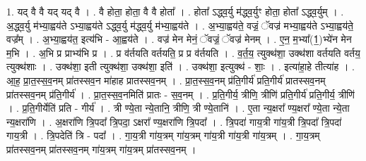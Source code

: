 \documentclass[17pt]{extarticle}
\begin{document}
1. यद् वै वै यद् यद् वै । . वै होता॒ होता॒ वै वै होता᳚ । . होता᳚ ऽद्ध्व॒र्यु म॑द्ध्व॒र्युꣳ होता॒ होता᳚ ऽद्ध्व॒र्युम् । . अ॒द्ध्व॒र्यु म॑भ्या॒ह्वय॑ते ऽभ्या॒ह्वय॑ते ऽद्ध्व॒र्यु म॑द्ध्व॒र्यु म॑भ्या॒ह्वय॑ते । . अ॒भ्या॒ह्वय॑ते॒ वज्रं॒ ॅवज्र॑ मभ्या॒ह्वय॑ते ऽभ्या॒ह्वय॑ते॒ वज्र᳚म् । . अ॒भ्या॒ह्वय॑त॒ इत्य॑भि - आ॒ह्वय॑ते । . वज्र॑ मेन मेनं॒ ॅवज्रं॒ ॅवज्र॑ मेनम् । . ए॒न॒ म॒भ्या᳚(1॒)भ्ये॑न मेन म॒भि । . अ॒भि प्र प्राभ्य॑भि प्र । . प्र व॑र्तयति वर्तयति॒ प्र प्र व॑र्तयति । . व॒र्त॒य॒ त्युक्थ॑शा॒ उक्थ॑शा वर्तयति वर्तय॒ त्युक्थ॑शाः । . उक्थ॑शा॒ इती त्युक्थ॑शा॒ उक्थ॑शा॒ इति॑ । . उक्थ॑शा॒ इत्युक्थ॑ - शाः॒ । . इत्या॑हा॒हे तीत्या॑ह । . आ॒ह॒ प्रा॒त॒स्स॒व॒नम् प्रा॑तस्सव॒न मा॑हाह प्रातस्सव॒नम् । . प्रा॒त॒स्स॒व॒नम् प्र॑ति॒गीर्य॑ प्रति॒गीर्य॑ प्रातस्सव॒नम् प्रा॑तस्सव॒नम् प्र॑ति॒गीर्य॑ । . प्रा॒त॒स्स॒व॒नमिति॑ प्रातः - स॒व॒नम् । . प्र॒ति॒गीर्य॒ त्रीणि॒ त्रीणि॑ प्रति॒गीर्य॑ प्रति॒गीर्य॒ त्रीणि॑ । . प्र॒ति॒गीर्येति॑ प्रति - गीर्य॑ । . त्री ण्ये॒ता न्ये॒तानि॒ त्रीणि॒ त्री ण्ये॒तानि॑ । . ए॒ता न्य॒क्षरा᳚ ण्य॒क्षरा᳚ ण्ये॒ता न्ये॒ता न्य॒क्षरा॑णि । . अ॒क्षरा॑णि त्रि॒पदा᳚ त्रि॒पदा॒ ऽक्षरा᳚ ण्य॒क्षरा॑णि त्रि॒पदा᳚ । . त्रि॒पदा॑ गाय॒त्री गा॑य॒त्री त्रि॒पदा᳚ त्रि॒पदा॑ गाय॒त्री । . त्रि॒पदेति॑ त्रि - पदा᳚ । . गा॒य॒त्री गा॑य॒त्रम् गा॑य॒त्रम् गा॑य॒त्री गा॑य॒त्री गा॑य॒त्रम् । . गा॒य॒त्रम् प्रा॑तस्सव॒नम् प्रा॑तस्सव॒नम् गा॑य॒त्रम् गा॑य॒त्रम् प्रा॑तस्सव॒नम् । \newline
\end{document}
